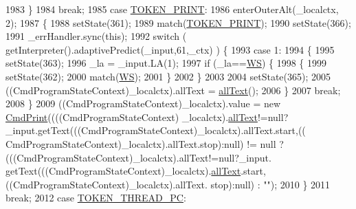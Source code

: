\begin{DoxyCode}
1983         \}
1984         \textcolor{keywordflow}{break};
1985       \textcolor{keywordflow}{case} \hyperlink{classgov_1_1nasa_1_1jpf_1_1inspector_1_1client_1_1parser_1_1_console_grammar_parser_a26f7fc768e8725fbe68d0edaa63d6647}{TOKEN\_PRINT}:
1986         enterOuterAlt(\_localctx, 2);
1987         \{
1988         setState(361);
1989         match(\hyperlink{classgov_1_1nasa_1_1jpf_1_1inspector_1_1client_1_1parser_1_1_console_grammar_parser_a26f7fc768e8725fbe68d0edaa63d6647}{TOKEN\_PRINT});
1990         setState(366);
1991         \_errHandler.sync(\textcolor{keyword}{this});
1992         \textcolor{keywordflow}{switch} ( getInterpreter().adaptivePredict(\_input,61,\_ctx) ) \{
1993         \textcolor{keywordflow}{case} 1:
1994           \{
1995           setState(363);
1996           \_la = \_input.LA(1);
1997           \textcolor{keywordflow}{if} (\_la==\hyperlink{classgov_1_1nasa_1_1jpf_1_1inspector_1_1client_1_1parser_1_1_console_grammar_parser_a6914a3a3adbc350b12a7df9d1b24abf1}{WS}) \{
1998             \{
1999             setState(362);
2000             match(\hyperlink{classgov_1_1nasa_1_1jpf_1_1inspector_1_1client_1_1parser_1_1_console_grammar_parser_a6914a3a3adbc350b12a7df9d1b24abf1}{WS});
2001             \}
2002           \}
2003 
2004           setState(365);
2005           ((CmdProgramStateContext)\_localctx).allText = \hyperlink{classgov_1_1nasa_1_1jpf_1_1inspector_1_1client_1_1parser_1_1_console_grammar_parser_a9dfaeb28734c8b3f7ec5a7b81ed7d42e}{allText}();
2006           \}
2007           \textcolor{keywordflow}{break};
2008         \}
2009          ((CmdProgramStateContext)\_localctx).value =  \textcolor{keyword}{new} \hyperlink{classgov_1_1nasa_1_1jpf_1_1inspector_1_1client_1_1commands_1_1_cmd_print}{CmdPrint}((((CmdProgramStateContext)
      \_localctx).\hyperlink{classgov_1_1nasa_1_1jpf_1_1inspector_1_1client_1_1parser_1_1_console_grammar_parser_a9dfaeb28734c8b3f7ec5a7b81ed7d42e}{allText}!=null?\_input.getText(((CmdProgramStateContext)\_localctx).allText.start,((
      CmdProgramStateContext)\_localctx).allText.stop):null) != null ? (((CmdProgramStateContext)\_localctx).allText!=null?\_input.
      getText(((CmdProgramStateContext)\_localctx).\hyperlink{classgov_1_1nasa_1_1jpf_1_1inspector_1_1client_1_1parser_1_1_console_grammar_parser_a9dfaeb28734c8b3f7ec5a7b81ed7d42e}{allText}.start,((CmdProgramStateContext)\_localctx).allText.
      stop):null) : \textcolor{stringliteral}{""}); 
2010         \}
2011         \textcolor{keywordflow}{break};
2012       \textcolor{keywordflow}{case} \hyperlink{classgov_1_1nasa_1_1jpf_1_1inspector_1_1client_1_1parser_1_1_console_grammar_parser_aaff98354be1a1583da6fc9387508ca64}{TOKEN\_THREAD\_PC}:

\end{DoxyCode}
